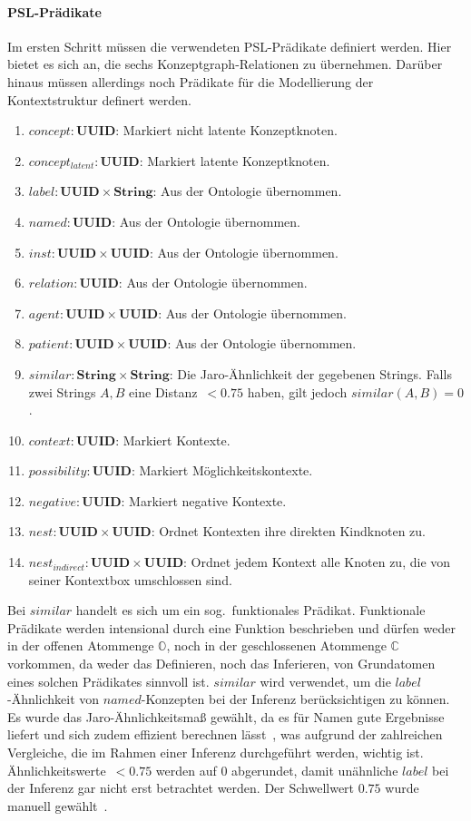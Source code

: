 \paragraph{PSL-Prädikate}
Im ersten Schritt müssen die verwendeten PSL-Prädikate definiert werden.
Hier bietet es sich an, die sechs Konzeptgraph-Relationen zu übernehmen.
Darüber hinaus müssen allerdings noch Prädikate für die Modellierung der Kontextstruktur definert werden.
\begin{enumerate}[noitemsep]
	\item $concept: \textbf{UUID}$: Markiert nicht latente Konzeptknoten.
	\item $concept_{latent}: \textbf{UUID}$: Markiert latente Konzeptknoten.
	\item $label: \textbf{UUID} \times \textbf{String}$: Aus der Ontologie übernommen.
	\item $named: \textbf{UUID}$: Aus der Ontologie übernommen.
	\item $inst: \textbf{UUID} \times \textbf{UUID}$: Aus der Ontologie übernommen.
	\item $relation: \textbf{UUID}$: Aus der Ontologie übernommen.
	\item $agent: \textbf{UUID} \times \textbf{UUID}$: Aus der Ontologie übernommen.
	\item $patient: \textbf{UUID} \times \textbf{UUID}$: Aus der Ontologie übernommen.
	\item $similar: \textbf{String} \times \textbf{String}$: Die Jaro-Ähnlichkeit der gegebenen Strings.
		Falls zwei Strings $A, B$ eine Distanz~$< 0.75$ haben, gilt jedoch $similar(A, B) = 0$.
	\item $context: \textbf{UUID}$: Markiert Kontexte.
	\item $possibility: \textbf{UUID}$: Markiert Möglichkeitskontexte.
	\item $negative: \textbf{UUID}$: Markiert negative Kontexte.
	\item $nest: \textbf{UUID} \times \textbf{UUID}$: Ordnet Kontexten ihre direkten Kindknoten zu.
	\item $nest_{indirect}: \textbf{UUID} \times \textbf{UUID}$: Ordnet jedem Kontext alle Knoten zu, die von seiner Kontextbox umschlossen sind.
\end{enumerate}
\edef\pslPredCount{\theenumi}

Bei $similar$ handelt es sich um ein sog.\ funktionales Prädikat.
Funktionale Prädikate werden intensional durch eine Funktion beschrieben und dürfen weder in der offenen Atommenge $\mathbb{O}$, noch in der geschlossenen Atommenge $\mathbb{C}$ vorkommen, da weder das Definieren, noch das Inferieren, von Grundatomen eines solchen Prädikates sinnvoll ist.
$similar$ wird verwendet, um die $label$-Ähnlichkeit von $named$-Konzepten bei der Inferenz berücksichtigen zu können.
Es wurde das Jaro-Ähnlichkeitsmaß gewählt, da es für Namen gute Ergebnisse liefert und sich zudem effizient berechnen lässt~\cite{Christen2006}, was aufgrund der zahlreichen Vergleiche, die im Rahmen einer Inferenz durchgeführt werden, wichtig ist.
Ähnlichkeitswerte~$< 0.75$ werden auf $0$ abgerundet, damit unähnliche $label$ bei der Inferenz gar nicht erst betrachtet werden.
Der Schwellwert $0.75$ wurde manuell gewählt~.

